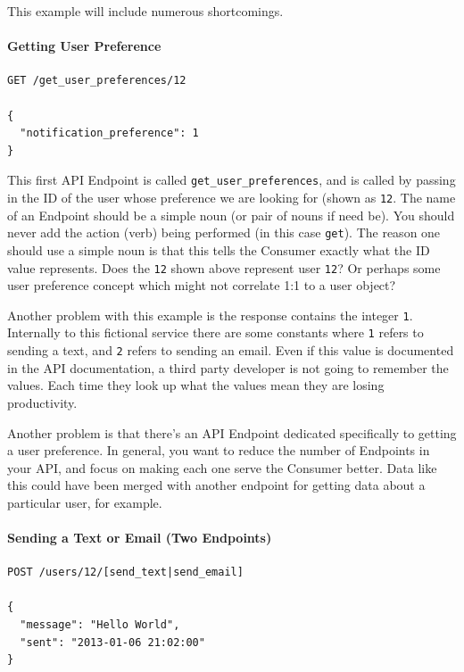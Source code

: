 \documentclass{book}
\begin{document}
This example will include numerous shortcomings.

\paragraph{\textbf{Getting User Preference}}

\begin{verbatim}
GET /get_user_preferences/12

{
  "notification_preference": 1
}
\end{verbatim}

This first API Endpoint is called \texttt{get\_user\_preferences}, and is called by passing in the ID of the user whose preference we are looking for (shown as \texttt{12}. The name of an Endpoint should be a simple noun (or pair of nouns if need be). You should never add the action (verb) being performed (in this case \texttt{get}). The reason one should use a simple noun is that this tells the Consumer exactly what the ID value represents. Does the \texttt{12} shown above represent user \texttt{12}? Or perhaps some user preference concept which might not correlate 1:1 to a user object?

Another problem with this example is the response contains the integer \texttt{1}. Internally to this fictional service there are some constants where \texttt{1} refers to sending a text, and \texttt{2} refers to sending an email. Even if this value is documented in the API documentation, a third party developer is not going to remember the values. Each time they look up what the values mean they are losing productivity.

Another problem is that there's an API Endpoint dedicated specifically to getting a user preference. In general, you want to reduce the number of Endpoints in your API, and focus on making each one serve the Consumer better. Data like this could have been merged with another endpoint for getting data about a particular user, for example.

\paragraph{\textbf{Sending a Text or Email (Two Endpoints)}}

\begin{verbatim}
POST /users/12/[send_text|send_email]

{
  "message": "Hello World",
  "sent": "2013-01-06 21:02:00"
}
\end{verbatim}
\end{document}
